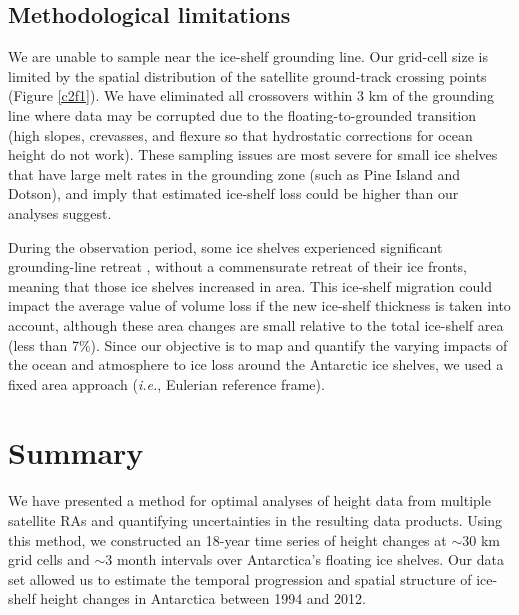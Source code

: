 \subsection{Methodological limitations}

We are unable to sample near the ice-shelf grounding line. Our grid-cell size is limited by the spatial distribution of the satellite ground-track crossing points (Figure \ref{c2f1}). We have eliminated all crossovers within 3 km of the grounding line where data may be corrupted due to the floating-to-grounded transition (high slopes, crevasses, and flexure so that hydrostatic corrections for ocean height do not work). These sampling issues are most severe for small ice shelves that have large melt rates in the grounding zone (such as Pine Island and Dotson), and imply that estimated ice-shelf loss could be higher than our analyses suggest.

During the observation period, some ice shelves experienced significant grounding-line retreat \parencite{Rignot2014}, without a commensurate retreat of their ice fronts, meaning that those ice shelves increased in area. This ice-shelf migration could impact the average value of volume loss if the new ice-shelf thickness is taken into account, although these area changes are small relative to the total ice-shelf area (less than 7\%). Since our objective is to map and quantify the varying impacts of the ocean and atmosphere to ice loss around the Antarctic ice shelves, we used a fixed area approach ({\it i.e.}, Eulerian reference frame).

\section*{Summary}

We have presented a method for optimal analyses of height data from multiple satellite RAs and quantifying uncertainties in the resulting data products. Using this method, we constructed an 18-year time series of height changes at $\sim$30 km grid cells and $\sim$3 month intervals over Antarctica's floating ice shelves. Our data set allowed us to estimate the temporal progression and spatial structure of ice-shelf height changes in Antarctica between 1994 and 2012.


